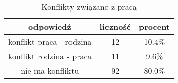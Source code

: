 \begin{table}[H]
\caption{Konflikty związane z pracą}
\centering
\begin{tabular}{ | c | c | c |}
\hline
odpowiedź & liczność & procent\\
\hline
konflikt praca - rodzina  &  12  & 10.4\% \\
\hline
konflikt rodzina - praca  &  11  & 9.6\% \\
\hline
nie ma konfliktu  &  92  & 80.0\% \\
\hline
\end{tabular}
\label{tab:Q27}
\end{table}
